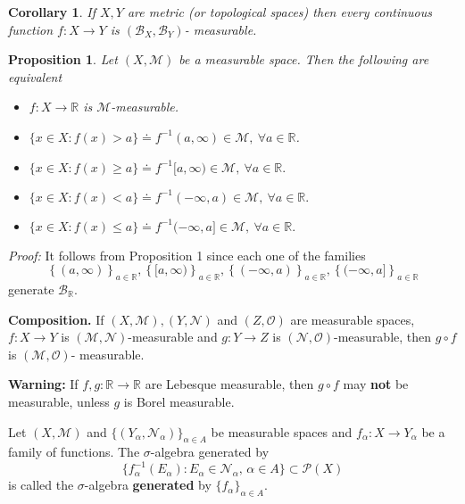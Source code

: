 \documentclass[12pt]{report}
\newtheorem{corollary}[theorem]{Corollary}
\newtheorem{prop}[theorem]{Proposition}
\begin{document}
\begin{corollary}  If $X, Y$ are metric (or topological
spaces) then every continuous function $f: X \longrightarrow Y$
is
$(\mathcal{B}_X,
\mathcal{B}_Y)$- measurable.
\end{corollary}

\begin{prop} \label{pr:R-meas} Let $(X, \mathcal{M})$ be a measurable
space.  Then the following are equivalent

\begin{itemize}
\item[(a)] $f: X \longrightarrow \mathbb{R}$ is
$\mathcal{M}$-measurable.
\item[(b)] $\{x \in X: f(x) > a\} \doteq f^{-1} (a, \infty) \in \mathcal{M}, \
\forall a \in \mathbb{R}$.
\item[(c)] $\{x \in X: f(x) \ge a\} \doteq f^{-1} [a, \infty) \in 
\mathcal{M}, \ \forall a \in \mathbb{R}.$
\item[(d)] $\{x \in X: f(x) < a\} \doteq f^{-1} (- \infty, a) \in 
\mathcal{M}, \ \forall a \in \mathbb{R}.$
\item[(e)] $\{x \in X: f(x) \le a\} \doteq f^{-1} (- \infty, a] \in
\mathcal{M}, \ \forall a
\in \mathbb{R}.$
\end{itemize}
\end{prop}

\noindent
{\em Proof:}  It follows from Proposition 1 since each one
of the families
\[
\left \{ (a, \infty) \right \}_{a \in \mathbb{R}}, \left \{ [a, \infty) 
\right \}_{a \in \mathbb{R}}, \left \{ (- \infty, a) \right \}_{a \in
\mathbb{R}}, \left \{(-
\infty, a]\right \}_{a \in \mathbb{R}}
\]
 generate $\mathcal{B}_{\mathbb{R}}$.


\bigskip
\noindent
\textbf{Composition.} If $(X, \mathcal{M}), (Y,
\mathcal{N})$ and
$(Z, \mathcal{O})$ are measurable spaces,  $f: X \longrightarrow
Y$ is $\left (\mathcal{M}, 
\mathcal{N}
\right )$-measurable and $g: Y \longrightarrow Z$ is $(\mathcal{N},
\mathcal{O})$-measurable, then $g \circ f$ is $(\mathcal{M},
\mathcal{O})$- measurable.

\smallskip
\noindent
\textbf{Warning:}  If $f, g: \mathbb{R} \longrightarrow \mathbb{R}$ are
Lebesque measurable, then $ g \circ f$ may \textbf{not} be measurable,
unless $g$ is Borel measurable.

\medskip
\noindent
 Let $(X, \mathcal{M})$ and $\{(Y_\alpha,
\mathcal{N}_\alpha)\}_{\alpha \in A}$ be measurable spaces and 
$f_\alpha: X \longrightarrow Y_\alpha$ be a family of functions.  The
$\sigma$-algebra generated by
\[
\{f^{-1}_\alpha(E_\alpha): E_\alpha \in \mathcal{N}_\alpha,
\, \alpha\in A\} \subset
\mathcal{P}(X)
\]
 is called the $\sigma$-algebra \textbf{generated} by
$\{f_\alpha\}_{\alpha \in A}$.
\end{document}
